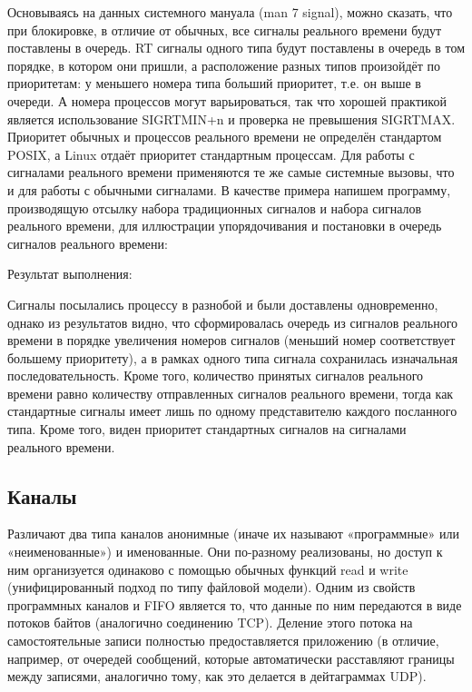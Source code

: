 \documentclass[a4paper]{article}
\begin{document}
	Основываясь на данных системного мануала (man 7 signal), можно сказать, что при блокировке, в отличие от обычных, все сигналы реального времени будут поставлены в очередь. RT сигналы одного типа будут поставлены в очередь в том порядке, в котором они пришли, а расположение разных типов произойдёт по приоритетам: у меньшего номера типа больший приоритет, т.е. он выше в очереди. А номера процессов могут варьироваться, так что хорошей практикой является использование SIGRTMIN+n и проверка не превышения SIGRTMAX. Приоритет обычных и процессов реального времени не определён стандартом POSIX, а Linux отдаёт приоритет стандартным процессам.
	Для работы с сигналами реального времени применяются те же самые системные вызовы, что и для работы с обычными сигналами. 
	В качестве примера напишем программу, производящую отсылку набора традиционных сигналов и набора сигналов реального времени, для иллюстрации упорядочивания и постановки в очередь сигналов реального времени:

	
	
	Результат выполнения:
	

	Сигналы посылались процессу в разнобой и были доставлены одновременно, однако из результатов видно, что сформировалась очередь из сигналов реального времени в порядке увеличения номеров сигналов (меньший номер соответствует большему приоритету), а в рамках одного типа сигнала сохранилась изначальная последовательность.  Кроме того, количество принятых сигналов реального времени равно количеству отправленных сигналов реального времени, тогда как стандартные сигналы имеет лишь по одному представителю каждого посланного типа. Кроме того, виден приоритет стандартных сигналов на сигналами реального времени.
\subsection{Каналы}
	Различают два типа каналов анонимные (иначе их называют «программные» или «неименованные») и именованные. Они по-разному реализованы, но доступ к ним организуется одинаково с помощью обычных функций read и write (унифицированный подход по типу файловой модели). Одним из свойств программных каналов и FIFO является то, что данные по ним передаются в виде потоков байтов (аналогично соединению TCP). Деление этого потока на самостоятельные записи полностью предоставляется приложению (в отличие, например, от очередей сообщений, которые автоматически расставляют границы между записями, аналогично тому, как это делается в дейтаграммах UDP).
		
\end{document}

